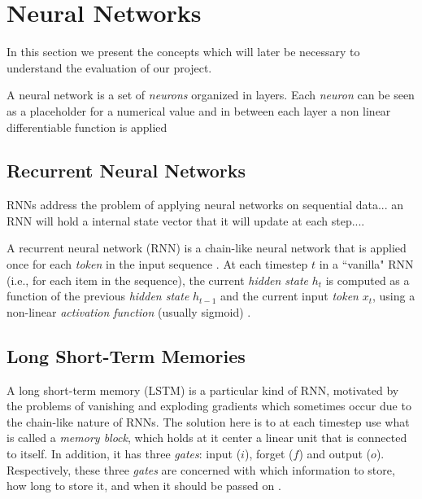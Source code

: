 \section{Neural Networks}
\label{sec:neural_networks}

In this section we present the concepts which will later be necessary to understand the evaluation of our project.

A neural network is a set of \textit{neurons} organized in layers. Each \textit{neuron} can be seen as a placeholder for a numerical value and in between each layer a non linear differentiable function is applied

\subsection{Recurrent Neural Networks}



RNNs address the problem of applying neural networks on sequential data... 
an RNN will hold a internal state vector that it will update at each step....







A recurrent neural network (RNN) is a chain-like neural network that is applied once for each \textit{token} in the input sequence \cite{cho_learning_2014}. At each timestep $t$ in a ``vanilla" RNN (i.e., for each item in the sequence), the current \textit{hidden state} $h_t$ is computed as a function of the previous \textit{hidden state} $h_{t-1}$ and the current input \textit{token} $x_t$, using a non-linear \textit{activation function} (usually sigmoid) \cite{cho_learning_2014}.

\subsection{Long Short-Term Memories}

A long short-term memory (LSTM) is a particular kind of RNN, motivated by the problems of vanishing and exploding gradients which sometimes occur due to the chain-like nature of RNNs. The solution here is to at each timestep use what is called a \textit{memory block}, which holds at it center a linear unit that is connected to itself. In addition, it has three \textit{gates}: input ($i$), forget ($f$) and output ($o$). Respectively, these three \textit{gates} are concerned with which information to store, how long to store it, and when it should be passed on \cite{gers_learning_2000}.

